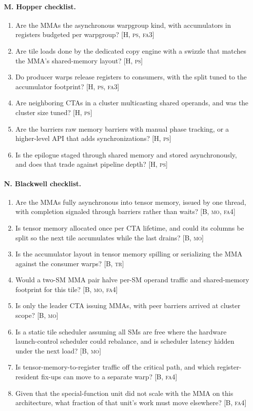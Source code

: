 \paragraph{M. Hopper checklist.}
\begin{enumerate}[nosep,leftmargin=*,resume]
\item Are the MMAs the asynchronous warpgroup kind, with accumulators in registers budgeted per warpgroup? [H, \textsc{ps}, \textsc{fa3}]
\item Are tile loads done by the dedicated copy engine with a swizzle that matches the MMA's shared-memory layout? [H, \textsc{ps}]
\item Do producer warps release registers to consumers, with the split tuned to the accumulator footprint? [H, \textsc{ps}, \textsc{fa3}]
\item Are neighboring CTAs in a cluster multicasting shared operands, and was the cluster size tuned? [H, \textsc{ps}]
\item Are the barriers raw memory barriers with manual phase tracking, or a higher-level API that adds synchronizations? [H, \textsc{ps}]
\item Is the epilogue staged through shared memory and stored asynchronously, and does that trade against pipeline depth? [H, \textsc{ps}]
\end{enumerate}

\paragraph{N. Blackwell checklist.}
\begin{enumerate}[nosep,leftmargin=*,resume]
\item Are the MMAs fully asynchronous into tensor memory, issued by one thread, with completion signaled through barriers rather than waits? [B, \textsc{mo}, \textsc{fa4}]
\item Is tensor memory allocated once per CTA lifetime, and could its columns be split so the next tile accumulates while the last drains? [B, \textsc{mo}]
\item Is the accumulator layout in tensor memory spilling or serializing the MMA against the consumer warps? [B, \textsc{tr}]
\item Would a two-SM MMA pair halve per-SM operand traffic and shared-memory footprint for this tile? [B, \textsc{mo}, \textsc{fa4}]
\item Is only the leader CTA issuing MMAs, with peer barriers arrived at cluster scope? [B, \textsc{mo}]
\item Is a static tile scheduler assuming all SMs are free where the hardware launch-control scheduler could rebalance, and is scheduler latency hidden under the next load? [B, \textsc{mo}]
\item Is tensor-memory-to-register traffic off the critical path, and which register-resident fix-ups can move to a separate warp? [B, \textsc{fa4}]
\item Given that the special-function unit did not scale with the MMA on this architecture, what fraction of that unit's work must move elsewhere? [B, \textsc{fa4}]
\end{enumerate}

